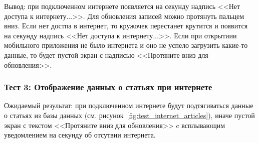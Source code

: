   

Вывод: при подключенном интернете появляется на секунду надпись <<Нет доступа к интернету...>>.
Для обновления записей можно протянуть пальцем вниз. Если нет достпа в интернет,
то кружочек перестанет крутится и появится на секунду надпись <<Нет доступа к интернету...>>.
Если при открытиии мобильного приложения не было интернета и оно не успело загрузить какие-то данные, то будет пустой экран с надписью
<<Протяните вниз для обновления>>.

\subsubsection*{Тест 3: Отображение данных о статьях при интернете}

Ожидаемый результат: при подключенном интернете будут подтягиваться данные о статьях из базы данных (см. рисунок~\ref{fig:test_internet_articles}),
иначе пустой экран с текстом <<Протяните вниз для обновления>>
c всплывающим уведомлением на секунду об отсутвии интернета.







